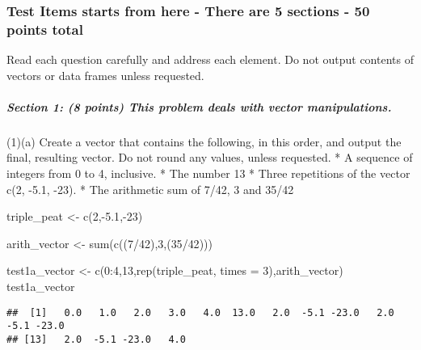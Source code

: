 \documentclass[
]{article}
\newenvironment{Shaded}{\begin{snugshade}}{\end{snugshade}}
\newcommand{\AttributeTok}[1]{\textcolor[rgb]{0.77,0.63,0.00}{#1}}
\newcommand{\DecValTok}[1]{\textcolor[rgb]{0.00,0.00,0.81}{#1}}
\newcommand{\FloatTok}[1]{\textcolor[rgb]{0.00,0.00,0.81}{#1}}
\newcommand{\FunctionTok}[1]{\textcolor[rgb]{0.00,0.00,0.00}{#1}}
\newcommand{\NormalTok}[1]{#1}
\newcommand{\OtherTok}[1]{\textcolor[rgb]{0.56,0.35,0.01}{#1}}
\newcommand{\SpecialCharTok}[1]{\textcolor[rgb]{0.00,0.00,0.00}{#1}}
\begin{document}
\hypertarget{test-items-starts-from-here---there-are-5-sections---50-points-total}{%
\subsubsection{Test Items starts from here - There are 5 sections - 50
points
total}\label{test-items-starts-from-here---there-are-5-sections---50-points-total}}

Read each question carefully and address each element. Do not output
contents of vectors or data frames unless requested.

\hypertarget{section-1-8-points-this-problem-deals-with-vector-manipulations.}{%
\subparagraph{Section 1: (8 points) This problem deals with vector
manipulations.}\label{section-1-8-points-this-problem-deals-with-vector-manipulations.}}

(1)(a) Create a vector that contains the following, in this order, and
output the final, resulting vector. Do not round any values, unless
requested. * A sequence of integers from 0 to 4, inclusive. * The number
13 * Three repetitions of the vector c(2, -5.1, -23). * The arithmetic
sum of 7/42, 3 and 35/42

\begin{Shaded}
\begin{Highlighting}[]
\NormalTok{triple\_peat }\OtherTok{\textless{}{-}} \FunctionTok{c}\NormalTok{(}\DecValTok{2}\NormalTok{,}\SpecialCharTok{{-}}\FloatTok{5.1}\NormalTok{,}\SpecialCharTok{{-}}\DecValTok{23}\NormalTok{)}

\NormalTok{arith\_vector }\OtherTok{\textless{}{-}} \FunctionTok{sum}\NormalTok{(}\FunctionTok{c}\NormalTok{((}\DecValTok{7}\SpecialCharTok{/}\DecValTok{42}\NormalTok{),}\DecValTok{3}\NormalTok{,(}\DecValTok{35}\SpecialCharTok{/}\DecValTok{42}\NormalTok{)))}

\NormalTok{test1a\_vector }\OtherTok{\textless{}{-}} \FunctionTok{c}\NormalTok{(}\DecValTok{0}\SpecialCharTok{:}\DecValTok{4}\NormalTok{,}\DecValTok{13}\NormalTok{,}\FunctionTok{rep}\NormalTok{(triple\_peat, }\AttributeTok{times =} \DecValTok{3}\NormalTok{),arith\_vector)}
\NormalTok{test1a\_vector}
\end{Highlighting}
\end{Shaded}

\begin{verbatim}
##  [1]   0.0   1.0   2.0   3.0   4.0  13.0   2.0  -5.1 -23.0   2.0  -5.1 -23.0
## [13]   2.0  -5.1 -23.0   4.0
\end{verbatim}
\end{document}
